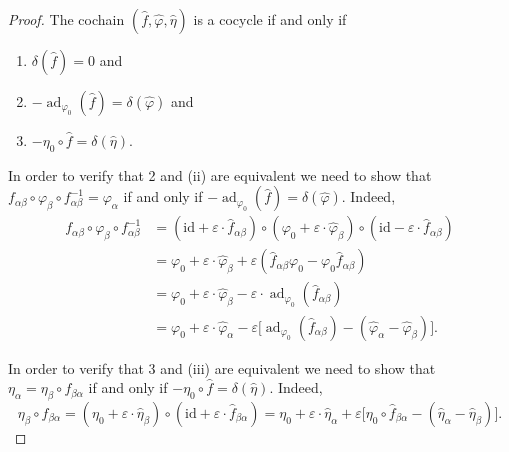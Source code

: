 \documentclass[12pt,a4paper,oneside,english]{smfart}
\theoremstyle{definition}
\theoremstyle{remark}
\DeclareMathOperator{\ad}{ad}
\begin{document}
\begin{proof}
The cochain $(\hat{f}, \hat{\varphi}, \hat{\eta})$ is a cocycle if and only if
\begin{enumerate}
    \item[(i)] $\delta(\hat{f}) = 0$ and
    \item[(ii)] $-\ad_{\varphi_0}(\hat{f}) = \delta(\hat{\varphi})$ and
    \item[(iii)] $-\eta_0 \circ \hat{f} = \delta(\hat{\eta})$.
\end{enumerate}
In order to verify that 2 and (ii) are equivalent we need to show that $f_{\alpha \beta} \circ \varphi_\beta \circ f_{\alpha \beta}^{-1} = \varphi_\alpha$ if and only if $-\ad_{\varphi_0}(\hat{f}) = \delta(\hat{\varphi})$. Indeed,
\begin{align*}
f_{\alpha \beta} \circ \varphi_\beta \circ f_{\alpha \beta}^{-1} &= (\mathrm{id} + \varepsilon \cdot \hat{f}_{\alpha \beta}) \circ (\varphi_0 + \varepsilon \cdot \hat{\varphi}_\beta) \circ (\mathrm{id} - \varepsilon \cdot \hat{f}_{\alpha \beta}) \\
&= \varphi_0 + \varepsilon \cdot \hat{\varphi}_\beta + \varepsilon(\hat{f}_{\alpha \beta}\varphi_0 - \varphi_0 \hat{f}_{\alpha \beta}) \\
&= \varphi_0 + \varepsilon \cdot \hat{\varphi}_\beta - \varepsilon \cdot \ad_{\varphi_0}(\hat{f}_{\alpha \beta}) \\
&= \varphi_0 + \varepsilon \cdot \hat{\varphi}_\alpha - \varepsilon\bigl[\ad_{\varphi_0}(\hat{f}_{\alpha \beta}) - (\hat{\varphi}_\alpha - \hat{\varphi}_\beta)\bigr].
\end{align*}

In order to verify that 3 and (iii) are equivalent we need to show that $\eta_\alpha = \eta_\beta \circ f_{\beta \alpha}$ if and only if $-\eta_0 \circ \hat{f} = \delta(\hat{\eta})$. Indeed,
\[
\eta_\beta \circ f_{\beta \alpha} = (\eta_0 + \varepsilon \cdot \hat{\eta}_\beta) \circ (\mathrm{id} + \varepsilon \cdot \hat{f}_{\beta \alpha}) = \eta_0 + \varepsilon \cdot \hat{\eta}_\alpha + \varepsilon\bigl[\eta_0 \circ \hat{f}_{\beta \alpha} - (\hat{\eta}_\alpha - \hat{\eta}_\beta)\bigr].
\]


\end{proof}
\end{document}
